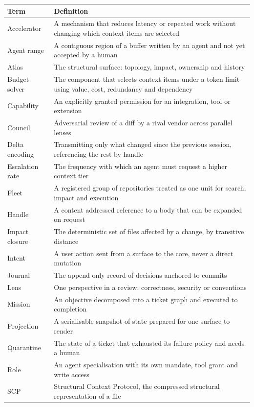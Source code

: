 \begin{longtable}{@{}p{} p{}@{}}
\toprule
\textbf{Term} & \textbf{Definition} \\
\midrule
\endhead
Accelerator & A mechanism that reduces latency or repeated work without changing which context items are selected \\
Agent range & A contiguous region of a buffer written by an agent and not yet accepted by a human \\
Atlas & The structural surface: topology, impact, ownership and history \\
Budget solver & The component that selects context items under a token limit using value, cost, redundancy and dependency \\
Capability & An explicitly granted permission for an integration, tool or extension \\
Council & Adversarial review of a diff by a rival vendor across parallel lenses \\
Delta encoding & Transmitting only what changed since the previous session, referencing the rest by handle \\
Escalation rate & The frequency with which an agent must request a higher context tier \\
Fleet & A registered group of repositories treated as one unit for search, impact and execution \\
Handle & A content addressed reference to a body that can be expanded on request \\
Impact closure & The deterministic set of files affected by a change, by transitive distance \\
Intent & A user action sent from a surface to the core, never a direct mutation \\
Journal & The append only record of decisions anchored to commits \\
Lens & One perspective in a review: correctness, security or conventions \\
Mission & An objective decomposed into a ticket graph and executed to completion \\
Projection & A serialisable snapshot of state prepared for one surface to render \\
Quarantine & The state of a ticket that exhausted its failure policy and needs a human \\
Role & An agent specialisation with its own mandate, tool grant and write access \\
SCP & Structural Context Protocol, the compressed structural representation of a file \\

\end{longtable}
